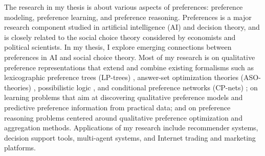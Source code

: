 %

The research in my thesis is about various aspects of preferences:
preference modeling, preference learning, and preference reasoning.
Preferences is a major research component studied
in artificial intelligence (AI) and decision theory, and is closely related to the 
social choice theory considered by economists and political scientists. 
In my thesis, I 
explore emerging connections between preferences in AI and social choice theory. 
Most of my research is on qualitative preference representations 
that extend and combine
existing formalisms such as  
lexicographic preference trees (LP-trees) \cite{booth:learningLP}, 
answer-set optimization theories (ASO-theories) \cite{Brewka:ASO}, 
possibilistic logic \cite{DuboisLP91}, and 
conditional preference networks (CP-nets) \cite{boutilier2004cp};
on learning problems that aim at discovering qualitative preference 
models and predictive preference information from practical data; and on
preference reasoning problems centered around qualitative preference optimization 
and aggregation methods.
Applications of my research include recommender systems, decision support tools,
multi-agent systems, and Internet trading and marketing platforms.

